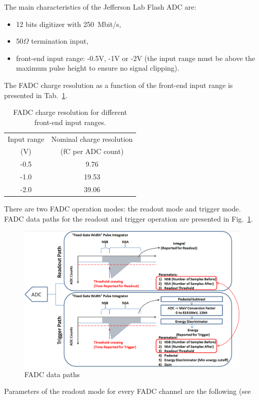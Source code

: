 The main characteristics of the Jefferson Lab Flash ADC are:
\begin{itemize}
\item 12 bits digitizer with 250~Mbit/s, 
\item 50$\Omega$ termination input, 
\item front-end input range:  -0.5V, -1V or -2V (the input range must be above the maximum pulse height to 
ensure no signal clipping).
\end{itemize}
The FADC charge resolution as a function of the front-end input range is presented in 
Tab.~\ref{tab:charge_resolution}.
\begin{table}[h]
\centering
\begin{tabular}{|c|c|}
\hline
Input range & Nominal charge resolution\\
(V) & (fC per ADC count)\\\hline
-0.5 & 9.76  \\\hline
-1.0 & 19.53  \\\hline
-2.0 & 39.06 \\\hline
\end{tabular}
\caption{FADC charge resolution for different front-end input ranges.}
\label{tab:charge_resolution}
\end{table}
There are two FADC operation modes: the readout mode and trigger mode.
FADC data paths for the readout and trigger operation are presented in Fig.~\ref{fig:hps_trigger_data}.
\begin{figure}[t]
\includegraphics[scale=0.4]{daq_trigger/figures/hps_trigger_data}
\caption{\small{FADC data paths}}
\label{fig:hps_trigger_data}
\end{figure}
Parameters of the readout  mode for every FADC channel are the following (see 
